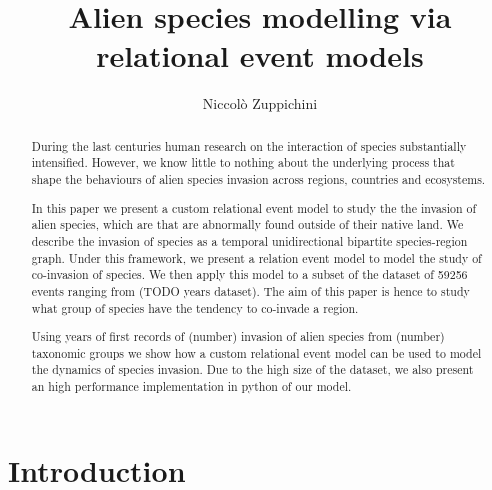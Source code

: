 \documentclass[mscthesis]{usiinfthesis}
\title{Alien species modelling via relational event models} %
\author{Niccol\`o Zuppichini} %
\newcommand\numberevents{59256 }
\begin{document}
\maketitle %

\frontmatter %

\begin{abstract}
During the last centuries human research on the interaction of species substantially intensified. However, we know little to nothing about the underlying process that shape the behaviours of alien species invasion across regions, countries and ecosystems.

In this paper we present a custom relational event model to study the the invasion of alien species, which are that are abnormally found outside of their native land. We describe the invasion of species as a temporal unidirectional bipartite species-region graph. Under this framework, we present a relation event model to model the study of co-invasion of species. We then apply this model to a subset of the dataset of \numberevents events ranging from (TODO years dataset). The aim of this paper is hence to study what group of species have the tendency to co-invade a region.

Using years of first records of (number) invasion of alien species from (number) taxonomic groups we show how a custom relational event model can be used to model the dynamics of species invasion. Due to the high size of the dataset, we also present an high performance implementation in python of our model.


\end{abstract}



\mainmatter

\chapter{Introduction}
\end{document}
